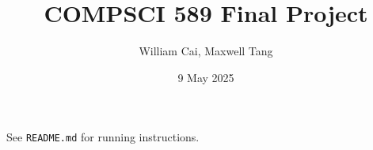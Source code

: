 \documentclass[letterpaper]{article}
\title{COMPSCI 589 Final Project}
\author{William Cai, Maxwell Tang}
\date{9 May 2025}
\begin{document}
    \maketitle
    See \verb|README.md| for running instructions.
    
    
    
    
    
\end{document}
